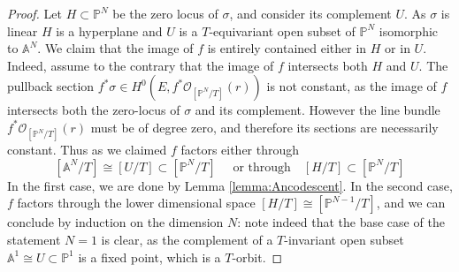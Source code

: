 \documentclass[10pt,a4paper]{amsart}
\newcommand{\bA}{\mathbb{A}}
\newcommand{\bP}{\mathbb{P}}
\newcommand{\cO}{\mathcal{O}}
\begin{document}
\begin{proof}
Let $H \subset \bP^N$ be the zero locus of $\sigma$, and consider its complement $U$. As $\sigma$ is linear $H$ is a hyperplane and $U$ is a $T$-equivariant open subset of $\bP^N$ isomorphic to $\mathbb{A}^N$. We claim that the image of $f$ is entirely contained either in $H$ or in $U$. Indeed, assume to the contrary that the image of  $f$ intersects both $H$ and $U$. The pullback section $f^\ast\sigma \in H^0(E, f^\ast\cO_{[\bP^N/T]}(r))$ is not constant, as the image of $f$ intersects both the zero-locus of $\sigma$ and its complement. However the line bundle $f^\ast\cO_{[\bP^N/T]}(r)$ must be of degree zero, and therefore its sections are necessarily constant. Thus as we claimed $f$ factors either through 
$$[\bA^N/T] \cong [U/T] \subset [\bP^N/T] \quad \text{ or through} \quad [H/T] \subset [\bP^N/T]$$ 
In the first case, we are done by Lemma \ref{lemma:Ancodescent}. In the second case, $f$ factors through the lower dimensional  space $[H/T] \cong [\bP^{N-1}/T]$, and we can conclude by induction on the dimension $N$: note indeed  that the base case of the statement $N=1$ is clear, as the complement of a $T$-invariant open subset $\bA^1 \cong U \subset \bP^1$ is a fixed point, which is a $T$-orbit. 
\end{proof}
\end{document}
